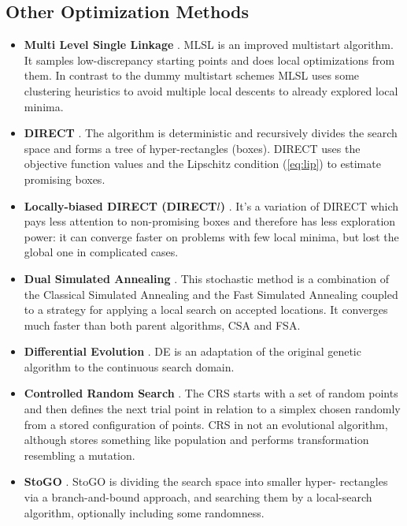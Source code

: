 \documentclass[runningheads]{llncs}
\begin{document}
\subsection{Other Optimization Methods}
\begin{itemize}
  \item \textbf{Multi Level Single Linkage} \cite{Kan1987StochasticGO}. MLSL is an improved
multistart algorithm.
  It samples low-discrepancy starting points and does local optimizations from them. In contrast to
the dummy multistart schemes
  MLSL uses some clustering heuristics to avoid multiple local descents to already explored local
minima.

  \item \textbf{DIRECT} \cite{Jones2009}. The algorithm is deterministic and recursively divides
the search space and forms a tree of hyper-rectangles (boxes). DIRECT uses the objective function
values and the Lipschitz condition (\ref{eq:lip}) to estimate promising boxes.

  \item \textbf{Locally-biased DIRECT (DIRECT$l$)} \cite{Gablonsky2001}. It's a variation of
DIRECT which pays less attention to non-promising boxes and therefore
  has less exploration power: it can converge faster on problems with few local minima, but lost the
global one in complicated cases.

  \item \textbf{Dual Simulated Annealing} \cite{XIANG1997216}. This stochastic method is a
combination of the Classical Simulated Annealing and the Fast Simulated Annealing coupled to a
strategy for applying a local search on accepted locations. It converges much faster than both parent
algorithms, CSA and FSA.

  \item \textbf{Differential Evolution} \cite{Storn1997}. DE is an adaptation of the original genetic
algorithm to
  the continuous search domain.

  \item \textbf{Controlled Random Search} \cite{Price1983}. The CRS starts with a set of random
points and then defines
  the next trial point in relation to a simplex chosen randomly from a stored configuration of points.
CRS in not an
  evolutional algorithm, although stores something like population and performs transformation
resembling a mutation.

  \item \textbf{StoGO} \cite{Madsen1998}. StoGO is dividing the search space into smaller hyper-
rectangles via a branch-and-bound approach,
  and searching them by a local-search algorithm, optionally including some randomness.

\end{itemize}
\end{document}
